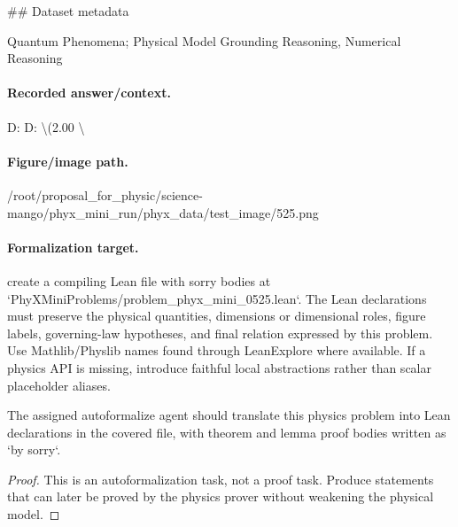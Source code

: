 \#\# Dataset metadata

Quantum Phenomena; Physical Model Grounding Reasoning, Numerical Reasoning

\paragraph{Recorded answer/context.}
D: D: \textbackslash{}(2.00 \textbackslash{}

\paragraph{Figure/image path.}
/root/proposal\_for\_physic/science-mango/phyx\_mini\_run/phyx\_data/test\_image/525.png

\paragraph{Formalization target.}
create a compiling Lean file with sorry bodies at `PhyXMiniProblems/problem\_phyx\_mini\_0525.lean`. The Lean declarations must preserve the physical quantities, dimensions or dimensional roles, figure labels, governing-law hypotheses, and final relation expressed by this problem.
Use Mathlib/Physlib names found through LeanExplore where available. If a physics API is missing, introduce faithful local abstractions rather than scalar placeholder aliases.

\begin{theorem}
\label{thm:physics:phyx_mini_0525:target}
The assigned autoformalize agent should translate this physics problem into Lean declarations in the covered file, with theorem and lemma proof bodies written as `by sorry`.
\end{theorem}
\begin{proof}
This is an autoformalization task, not a proof task. Produce statements that can later be proved by the physics prover without weakening the physical model.
\end{proof}

